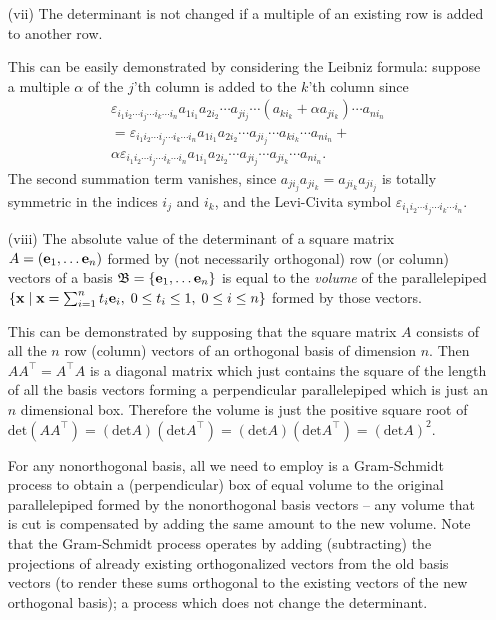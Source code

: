 \begin{itemize}
\item[(vii)]
The determinant is not changed if a multiple of an existing row is added to another row.

{\color{OliveGreen}
\bproof
This can be easily demonstrated by considering the Leibniz formula: suppose a multiple $\alpha$
of the $j$'th column is added to the $k$'th column since
\begin{equation}
\begin{split}
\varepsilon_{i_1 i_2\cdots i_j \cdots i_k \cdots i_n} a_{1i_1}a_{2i_2} \cdots a_{j i_j} \cdots (a_{k i_k} + \alpha a_{j i_k}) \cdots a_{ni_n}\\
=
\varepsilon_{i_1 i_2\cdots i_j \cdots i_k \cdots i_n} a_{1i_1}a_{2i_2} \cdots a_{j i_j} \cdots  a_{k i_k} \cdots a_{ni_n} +\\
\alpha \varepsilon_{i_1 i_2\cdots i_j \cdots i_k \cdots i_n} a_{1i_1}a_{2i_2} \cdots a_{j i_j} \cdots   a_{j i_k} \cdots a_{ni_n}.
\end{split}
\end{equation}
The second summation term vanishes, since
$
a_{j i_j} a_{j i_k}
=
a_{j i_k} a_{j i_j}
$
is totally symmetric in the indices $i_j$ and $i_k$,
and the Levi-Civita symbol $\varepsilon_{i_1 i_2\cdots i_j \cdots i_k \cdots i_n}$.
\eproof
}

\item[(viii)]
The absolute value of the determinant of a square matrix $A= \left({\bf e}_1, \ldots {\bf e}_n \right)$ formed by (not necessarily orthogonal)
row (or column) vectors of a basis
$\frak B= \{ {\bf e}_1, \ldots {\bf e}_n\}$
is equal to the {\em volume} of the parallelepiped
$
\left\{ {\bf x} \mid {\bf x} =\sum_{i=1}^n t_i {\bf e}_i, \; 0 \le t_i \le 1, \; 0\le i \le n \right\}
$
formed by those vectors.

{\color{OliveGreen}
\bproof
This can be demonstrated 
by supposing that
the square matrix $A$ consists of all the $n$ row (column) vectors of an orthogonal basis of dimension $n$.
Then
$AA^\intercal =A^\intercal A$ is a  diagonal matrix  which just contains the square of the
length of all the basis vectors forming a perpendicular parallelepiped which
is just an $n$ dimensional box.
Therefore the volume is just the positive square root of
$\textrm{det} ( AA^\intercal  ) =
(\textrm{det} A) (\textrm{det} A^\intercal  ) = (\textrm{det} A) (\textrm{det} A^\intercal  )=(\textrm{det} A)^2$.

For any nonorthogonal basis, all we need to employ is a Gram-Schmidt process
to obtain a (perpendicular) box of equal volume to the original parallelepiped
formed by the nonorthogonal basis vectors --
any volume that is cut is compensated by adding the same amount to the new volume.
Note that the Gram-Schmidt process operates by adding (subtracting) the projections
of already existing orthogonalized vectors
from the old basis vectors (to render these sums orthogonal to the existing vectors of the new orthogonal basis);
a process which does not change the determinant.
\eproof
}


\end{itemize}

